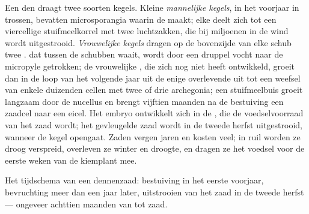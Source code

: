 \begin{proposition}\label{prop:b2:plant-life-cycles:conifer}
Een den draagt twee soorten kegels. Kleine \emph{mannelijke kegels}, in
het voorjaar in trossen, bevatten microsporangia waarin de 
 maakt; elke  deelt zich tot een viercellige
stuifmeelkorrel met twee luchtzakken, die bij miljoenen in de wind wordt
uitgestrooid. \emph{Vrouwelijke kegels} dragen op de bovenzijde van elke
schub twee .  dat tussen de schubben waait, wordt
door een druppel vocht naar de micropyle getrokken; de vrouwelijke
, die zich nog niet heeft ontwikkeld, groeit dan in de loop van
het volgende jaar uit de enige overlevende  uit tot een weefsel
van enkele duizenden cellen met twee of drie archegonia; een
stuifmeelbuis groeit langzaam door de nucellus en brengt vijftien
maanden na de bestuiving een zaadcel naar een eicel. Het embryo
ontwikkelt zich in de , die de voedselvoorraad van het zaad
wordt; het gevleugelde zaad wordt in de tweede herfst uitgestrooid,
wanneer de kegel opengaat. Zaden vergen jaren en kosten veel; in ruil
worden ze droog verspreid, overleven ze winter en droogte, en dragen ze
het voedsel voor de eerste weken van de kiemplant mee.
\end{proposition}

\begin{omfigure}

{\small Het tijdschema van een dennenzaad: bestuiving in het eerste
voorjaar, bevruchting meer dan een jaar later, uitstrooien van het zaad
in de tweede herfst --- ongeveer achttien maanden van  tot zaad.}
\end{omfigure}


